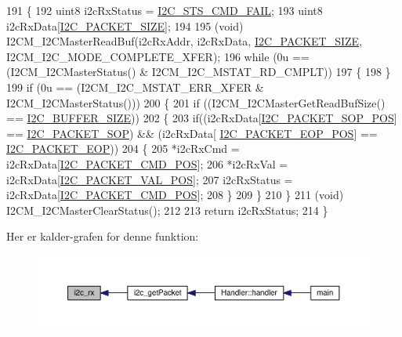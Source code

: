 \begin{DoxyCode}
191 \{
192   uint8 i2cRxStatus = \hyperlink{i2c_8h_aee0adbd7dcb13e95337369b7342a27e3}{I2C\_STS\_CMD\_FAIL};
193   uint8 i2cRxData[\hyperlink{i2c_8h_a8c24abf58121f3c16b5f687cc2946cd1}{I2C\_PACKET\_SIZE}];
194   
195   (void) I2CM\_I2CMasterReadBuf(i2cRxAddr, i2cRxData, \hyperlink{i2c_8h_a8c24abf58121f3c16b5f687cc2946cd1}{I2C\_PACKET\_SIZE}, 
      I2CM\_I2C\_MODE\_COMPLETE\_XFER);
196   \textcolor{keywordflow}{while} (0u == (I2CM\_I2CMasterStatus() & I2CM\_I2C\_MSTAT\_RD\_CMPLT))
197   \{
198   \}
199   \textcolor{keywordflow}{if} (0u == (I2CM\_I2C\_MSTAT\_ERR\_XFER & I2CM\_I2CMasterStatus()))
200   \{
201     \textcolor{keywordflow}{if} ((I2CM\_I2CMasterGetReadBufSize() == \hyperlink{i2c_8h_a6458dbf193a0eef0470fc1b08400bfcd}{I2C\_BUFFER\_SIZE}))
202     \{
203       \textcolor{keywordflow}{if}((i2cRxData[\hyperlink{i2c_8h_a1207f4b2c3692b1a344f0013da629310}{I2C\_PACKET\_SOP\_POS}] == \hyperlink{i2c_8h_a52bb5b964361ed2f1b18df32c5b8f2c5}{I2C\_PACKET\_SOP}) && (i2cRxData[
      \hyperlink{i2c_8h_a940f0ea8103872c7ba81b9dc0f121feb}{I2C\_PACKET\_EOP\_POS}] == \hyperlink{i2c_8h_a62b4ae6e51a3d0da47f5165165cdbc0a}{I2C\_PACKET\_EOP}))
204       \{
205         *i2cRxCmd = i2cRxData[\hyperlink{i2c_8h_ac13fcfeded7dc2d82fa4734456f3761f}{I2C\_PACKET\_CMD\_POS}];
206         *i2cRxVal = i2cRxData[\hyperlink{i2c_8h_a68506c3651f015716bb2c135e8e7b972}{I2C\_PACKET\_VAL\_POS}];
207         i2cRxStatus = i2cRxData[\hyperlink{i2c_8h_ac13fcfeded7dc2d82fa4734456f3761f}{I2C\_PACKET\_CMD\_POS}];
208       \}
209     \}
210   \}
211   (void) I2CM\_I2CMasterClearStatus();
212   
213   \textcolor{keywordflow}{return} i2cRxStatus;
214 \}
\end{DoxyCode}


Her er kalder-\/grafen for denne funktion\+:\nopagebreak
\begin{figure}[H]
\begin{center}
\leavevmode
\includegraphics[width=350pt]{class_i2_c_a802cdc1702988bf2e8efaba23eb0ce1b_icgraph}
\end{center}
\end{figure}


